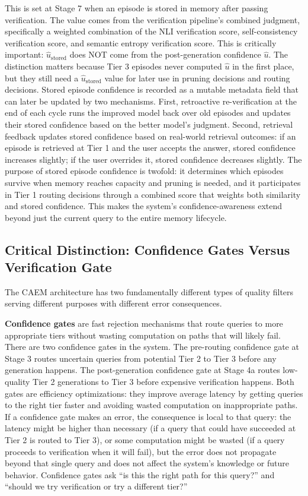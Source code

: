 \documentclass[11pt,a4paper]{article}
\newcommand{\uhat}{\hat{u}}
\newcommand{\ustored}{\hat{u}_{\text{stored}}}
\begin{document}
This is set at Stage 7 when an episode is stored in memory after passing verification. The value comes from the verification pipeline's combined judgment, specifically a weighted combination of the NLI verification score, self-consistency verification score, and semantic entropy verification score. This is critically important: $\ustored$ does NOT come from the post-generation confidence $\uhat$. The distinction matters because Tier 3 episodes never computed $\uhat$ in the first place, but they still need a $\ustored$ value for later use in pruning decisions and routing decisions. Stored episode confidence is recorded as a mutable metadata field that can later be updated by two mechanisms. First, retroactive re-verification at the end of each cycle runs the improved model back over old episodes and updates their stored confidence based on the better model's judgment. Second, retrieval feedback updates stored confidence based on real-world retrieval outcomes: if an episode is retrieved at Tier 1 and the user accepts the answer, stored confidence increases slightly; if the user overrides it, stored confidence decreases slightly. The purpose of stored episode confidence is twofold: it determines which episodes survive when memory reaches capacity and pruning is needed, and it participates in Tier 1 routing decisions through a combined score that weights both similarity and stored confidence. This makes the system's confidence-awareness extend beyond just the current query to the entire memory lifecycle.

\subsection{Critical Distinction: Confidence Gates Versus Verification Gate}

The CAEM architecture has two fundamentally different types of quality filters serving different purposes with different error consequences.

\textbf{Confidence gates} are fast rejection mechanisms that route queries to more appropriate tiers without wasting computation on paths that will likely fail. There are two confidence gates in the system. The pre-routing confidence gate at Stage 3 routes uncertain queries from potential Tier 2 to Tier 3 before any generation happens. The post-generation confidence gate at Stage 4a routes low-quality Tier 2 generations to Tier 3 before expensive verification happens. Both gates are efficiency optimizations: they improve average latency by getting queries to the right tier faster and avoiding wasted computation on inappropriate paths. If a confidence gate makes an error, the consequence is local to that query: the latency might be higher than necessary (if a query that could have succeeded at Tier 2 is routed to Tier 3), or some computation might be wasted (if a query proceeds to verification when it will fail), but the error does not propagate beyond that single query and does not affect the system's knowledge or future behavior. Confidence gates ask ``is this the right path for this query?'' and ``should we try verification or try a different tier?''
\end{document}
